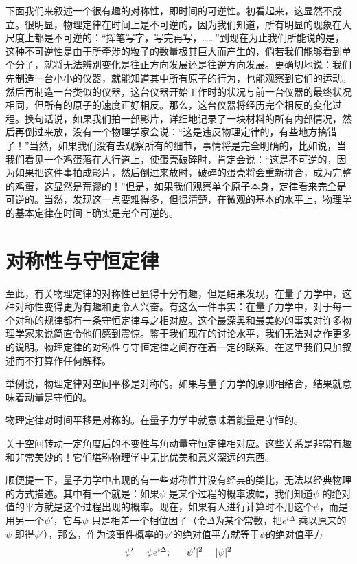 下面我们来叙述一个很有趣的对称性，即时间的可逆性。初看起来，这显然不成立。很明显，物理定律在时间上是不可逆的，因为我们知道，所有明显的现象在大尺度上都是不可逆的：“挥笔写字，写完再写，……”到现在为止我们所能说的是，这种不可逆性是由于所牵涉的粒子的数量极其巨大而产生的，倘若我们能够看到单个分子，就将无法辨别变化是往正方向发展还是往逆方向发展。更确切地说：我们先制造一台小小的仪器，就能知道其中所有原子的行为，也能观察到它们的运动。然后再制造一台类似的仪器，这台仪器开始工作时的状况与前一台仪器的最终状况相同，但所有的原子的速度正好相反。那么，这台仪器将经历完全相反的变化过程。换句话说，如果我们拍一部影片，详细地记录了一块材料的所有内部情况，然后再倒过来放，没有一个物理学家会说：“这是违反物理定律的，有些地方搞错了！”当然，如果我们没有去观察所有的细节，事情将是完全明确的，比如说，当我们看见一个鸡蛋落在人行道上，使蛋壳破碎时，肯定会说：“这是不可逆的，因为如果把这件事拍成影片，然后倒过来放时，破碎的蛋壳将会重新拼合，成为完整的鸡蛋，这显然是荒谬的！”但是，如果我们观察单个原子本身，定律看来完全是可逆的。当然，发现这一点要难得多，但很清楚，在微观的基本的水平上，物理学的基本定律在时间上确实是完全可逆的。

\section{对称性与守恒定律}

至此，有关物理定律的对称性已显得十分有趣，但是结果发现，在量子力学中，这种对称性变得更为有趣和更令人兴奋。有这么一件事实：在量子力学中，对于每一个对称的规律都有一条守恒定律与之相对应。这个最深奥和最美妙的事实对许多物理学家来说简直令他们感到震惊。鉴于我们现在的讨论水平，我们无法对之作更多的说明。物理定律的对称性与守恒定律之间存在着一定的联系。在这里我们只加叙述而不打算作任何解释。

举例说，物理定律对空间平移是对称的。如果与量子力学的原则相结合，结果就意味着动量是守恒的。

物理定律对时间平移是对称的。在量子力学中就意味着能量是守恒的。

关于空间转动一定角度后的不变性与角动量守恒定律相对应。这些关系是非常有趣和非常美妙的！它们堪称物理学中无比优美和意义深远的东西。

顺便提一下，量子力学中出现的有一些对称性并没有经典的类比，无法以经典物理的方式描述。其中有一个就是：如果$\psi$ 是某个过程的概率波幅，我们知道$\psi$ 的绝对值的平方就是这个过程出现的概率。现在，如果有人进行计算时不用这个$\psi$，而是用另一个$\psi'$，它与$\psi$ 只是相差一个相位因子（令$\Delta$为某个常数，把$e^{i\Delta}$ 乘以原来的$\psi$ 即得$\psi'$），那么，作为该事件概率的$\psi'$的绝对值平方就等于$\psi$的绝对值平方
\begin{equation*}
    \psi' = \psi e^{i\Delta}; ~~~~ \lvert\psi'\rvert^2 = \lvert\psi\rvert^2
\end{equation*}

